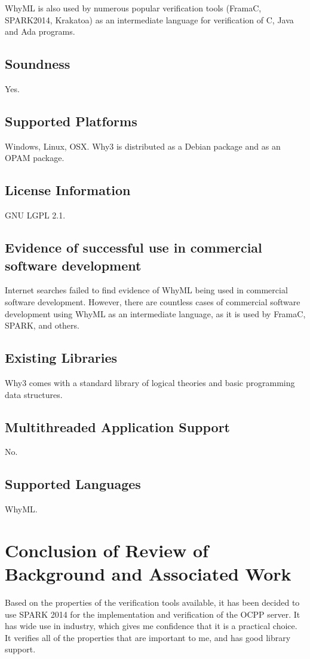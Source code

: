 \documentclass[12pt,openany,a4paper]{book}
\begin{document}
	WhyML is also used by numerous popular verification tools (FramaC, SPARK2014, Krakatoa) as an intermediate language for verification of C, Java and Ada programs.
	\subsection{Soundness}
	Yes.
	\subsection{Supported Platforms}
	Windows, Linux, OSX. Why3 is distributed as a Debian package and as an OPAM package.
	
	\subsection{License Information}
	GNU LGPL 2.1.
	\subsection{Evidence of successful use in commercial software development}
		Internet searches failed to find evidence of WhyML being used in commercial software development. However, there are countless cases of commercial software development using WhyML as an intermediate language, as it is used by FramaC, SPARK, and others.
 
	\subsection{Existing Libraries}
	Why3 comes with a standard library of logical theories and basic programming data structures.
	\subsection{Multithreaded Application Support}
	No.
	\subsection{Supported Languages}
	WhyML.

\section{Conclusion of Review of Background and Associated Work}
Based on the properties of the verification tools available, it has been decided to use SPARK 2014 for the implementation and verification of the OCPP server. It has wide use in industry, which gives me confidence that it is a practical choice. It verifies all of the properties that are important to me, and has good library support.
\end{document}
